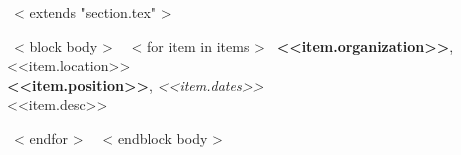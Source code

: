 ~< extends "section.tex" >~

~< block body >~
    ~< for item in items >~
        {\bf <<item.organization>>}, <<item.location>> \\
        {\bf <<item.position>>}, {\it <<item.dates>> } \\
        <<item.desc>>


    ~< endfor >~
~< endblock body >~
